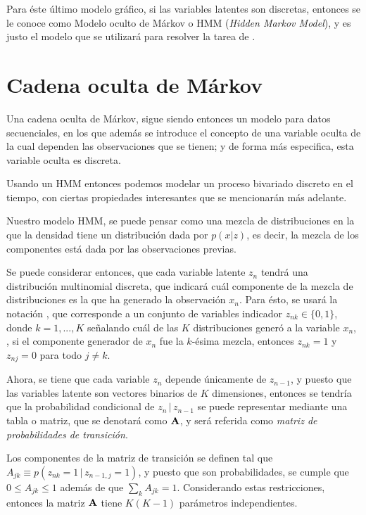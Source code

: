 Para éste último modelo gráfico, si las variables latentes son discretas, entonces se le conoce como Modelo oculto de Márkov o HMM (\textit{Hidden Markov Model}), y es justo el modelo que se utilizará para resolver la tarea de \sd.

\section{Cadena oculta de Márkov}

Una cadena oculta de Márkov, sigue siendo entonces un modelo para datos secuenciales, en los que además se introduce el concepto de una variable oculta de la cual dependen las observaciones que se tienen; y de forma más especifica, esta variable oculta es discreta. 

Usando un HMM entonces podemos modelar un proceso bivariado discreto en el tiempo, con ciertas propiedades interesantes que se mencionarán más adelante.

Nuestro modelo HMM, se puede pensar como una mezcla de distribuciones en la que la densidad tiene un distribución dada por $p(x|z)$, es decir, la mezcla de los componentes está dada por las observaciones previas.

Se puede considerar entonces, que cada variable latente $z_n$ tendrá una distribución multinomial discreta, que indicará cuál componente de la mezcla de distribuciones es la que ha generado la observación $x_n$. Para ésto, se usará la notación \unk, que corresponde a un conjunto de variables indicador $z_{nk} \in \lbrace 0, 1 \rbrace$, donde $k = 1, ..., K$ señalando cuál de las $K$ distribuciones generó a la variable $x_n$, \ie, si el componente generador de $x_n$ fue la $k$-ésima mezcla, entonces $z_{nk} = 1$ y $z_{nj} = 0$ para todo $j \neq k$.

Ahora, se tiene que cada variable $z_n$ depende únicamente de $z_{n-1}$, y puesto que las variables latente son vectores binarios de $K$ dimensiones, entonces se tendría que la probabilidad condicional de $z_n \,|\, z_{n-1}$ se puede representar mediante una tabla o matriz, que se denotará como $\textbf{A}$, y será referida como \textit{matriz de probabilidades de transición}. 

Los componentes de la matriz de transición se definen tal que $A_{jk} \equiv p(z_{nk} = 1 \,|\,  z_{n-1, j} = 1)$, y puesto que son probabilidades, se cumple que $0 \leq A_{jk} \leq 1$ además de que $\sum_k A_{jk} = 1$. Considerando estas restricciones, entonces la matriz $\textbf{A}$ tiene $K (K-1)$ parámetros independientes.

